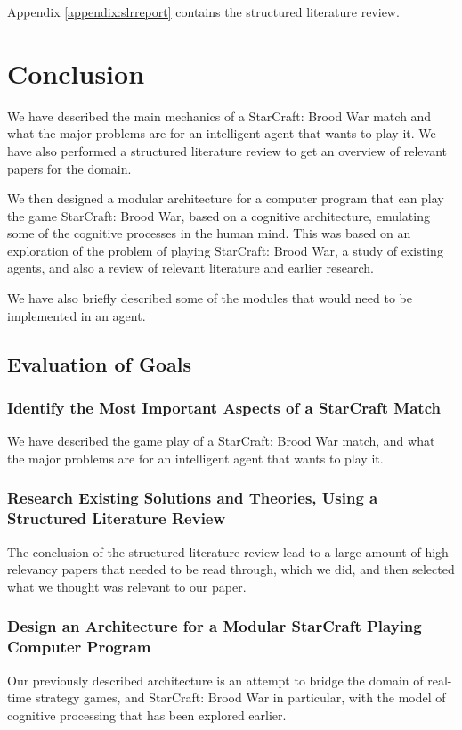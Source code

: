 Appendix \ref{appendix:slrreport} contains the structured literature review.

\section{Conclusion}
We have described the main mechanics of a StarCraft: Brood War match and what
the major problems are for an intelligent agent that wants to play it. We have
also performed a structured literature review to get an overview of relevant
papers for the domain.

We then designed a modular architecture for a computer program that can play the
game StarCraft: Brood War, based on a cognitive architecture, emulating some of
the cognitive processes in the human mind. This was based on an exploration of
the problem of playing StarCraft: Brood War, a study of existing agents, and
also a review of relevant literature and earlier research.

We have also briefly described some of the modules that would need to be
implemented in an agent.

\subsection{Evaluation of Goals}
\subsubsection{Identify the Most Important Aspects of a StarCraft Match}
We have described the game play of a StarCraft: Brood War match, and what the
major problems are for an intelligent agent that wants to play it.
\subsubsection{Research Existing Solutions and Theories, Using a Structured
Literature Review}
The conclusion of the structured literature review lead to a large amount of
high-relevancy papers that needed to be read through, which we did, and then
selected what we thought was relevant to our paper.
\subsubsection{Design an Architecture for a Modular StarCraft Playing Computer
Program}
Our previously described architecture is an attempt to bridge the domain of
real-time strategy games, and StarCraft: Brood War in particular, with the
model of cognitive processing that has been explored earlier.

